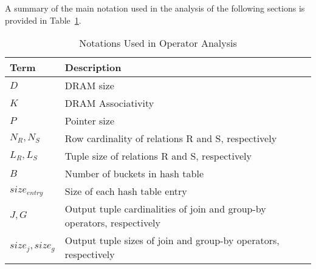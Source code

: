 A summary of the main notation used in the analysis of the following
sections is provided in Table~\ref{tab:notations}.

\begin{table}[!h]
\centering
\caption{Notations Used in Operator Analysis}
\label{tab:notations}
\begin{small}
\begin{tabular}{p{2cm}p{9cm}}
\toprule  
\textbf{Term} & \textbf{Description}\\ 
\midrule
\textbf{$D$} & DRAM size\\
\textbf{$K$} & DRAM Associativity\\
\textbf{$P$} & Pointer size\\
\textbf{$N_R, N_S$} & Row cardinality of relations R and S, respectively\\
\textbf{$L_R, L_S$} & Tuple size of relations R and S, respectively\\
\textbf{$B$} & Number of buckets in hash table\\
\textbf{$size_{entry}$} & Size of each hash table entry\\
\textbf{$J,G$} & Output tuple cardinalities of join and group-by operators, respectively\\
\textbf{$size_{j},size_{g}$} & Output tuple sizes of join and group-by operators, respectively\\
\bottomrule
\end{tabular}
\end{small}
\end{table}
